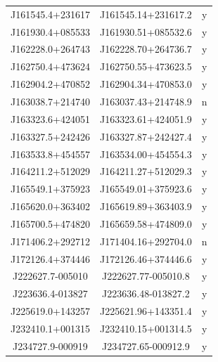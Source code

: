 \begin{table}
\begin{tabular}{ccc}
        J161545.4+231617 & J161545.14+231617.2 & y\\
        J161930.4+085533 & J161930.51+085532.6 & y\\
        J162228.0+264743 & J162228.70+264736.7 & y\\
        J162750.4+473624 & J162750.55+473623.5 & y\\
        J162904.2+470852 & J162904.34+470853.0 & y\\
        J163038.7+214740 & J163037.43+214748.9 & n\\
        J163323.6+424051 & J163323.61+424051.9 & y\\
        J163327.5+242426 & J163327.87+242427.4 & y\\
        J163533.8+454557 & J163534.00+454554.3 & y\\
        J164211.2+512029 & J164211.27+512029.3 & y\\
        J165549.1+375923 & J165549.01+375923.6 & y\\
        J165620.0+363402 & J165619.89+363403.9 & y\\
        J165700.5+474820 & J165659.58+474809.0 & y\\
        J171406.2+292712 & J171404.16+292704.0 & n\\
        J172126.4+374446 & J172126.46+374446.6 & y\\
        J222627.7-005010 & J222627.77-005010.8 & y\\
        J223636.4-013827 & J223636.48-013827.2 & y\\
        J225619.0+143257 & J225621.96+143351.4 & y\\
        J232410.1+001315 & J232410.15+001314.5 & y\\
        J234727.9-000919 & J234727.65-000912.9 & y\\\hline\hline
  \end{tabular}
\end{table}

